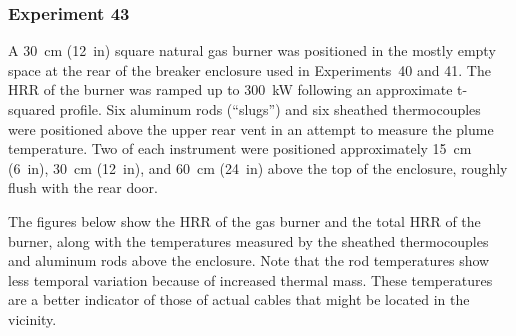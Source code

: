 \clearpage

\subsubsection{Experiment 43}

A 30~cm (12~in) square natural gas burner was positioned in the mostly empty space at the rear of the breaker enclosure used in Experiments~40 and 41. The HRR of the burner was ramped up to 300~kW following an approximate t-squared profile. Six aluminum rods (``slugs'') and six sheathed thermocouples were positioned above the upper rear vent in an attempt to measure the plume temperature. Two of each instrument were positioned approximately 15~cm (6~in), 30~cm (12~in), and 60~cm (24~in) above the top of the enclosure, roughly flush with the rear door.

The figures below show the HRR of the gas burner and the total HRR of the burner, along with the temperatures measured by the sheathed thermocouples and aluminum rods above the enclosure. Note that the rod temperatures show less temporal variation because of increased thermal mass. These temperatures are a better indicator of those of actual cables that might be located in the vicinity. 

